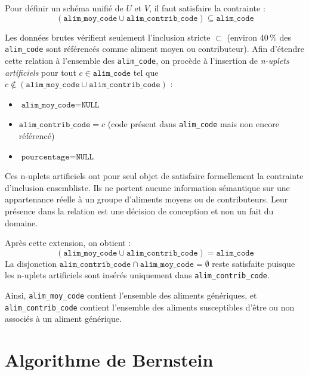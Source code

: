 \documentclass[12pt, a4paper]{article}
\newcommand{\attr}[1]{\texttt{#1}}
\begin{document}
    Pour définir un schéma unifié de $U$ et $V$, il faut satisfaire la contrainte :
    \[
        (\attr{alim\_moy\_code} \cup \attr{alim\_contrib\_code}) \subseteq \attr{alim\_code}
    \]

    Les données brutes vérifient seulement l'inclusion stricte $\subset$ (environ 40\,\% des
    \attr{alim\_code} sont référencés comme aliment moyen ou contributeur). Afin d'étendre cette relation
    à l'ensemble des \attr{alim\_code}, on procède à l'insertion de \emph{n-uplets artificiels} pour tout
    $c \in \attr{alim\_code}$ tel que
    $c \notin (\attr{alim\_moy\_code} \cup \attr{alim\_contrib\_code})$ :

    \begin{itemize}
        \item $\attr{alim\_moy\_code} = \texttt{NULL}$
        \item $\attr{alim\_contrib\_code} = c$ \quad (code présent dans \attr{alim\_code} mais non encore référencé)
        \item $\attr{pourcentage} = \texttt{NULL}$
    \end{itemize}

    \begin{notebox}
        \small
        Ces n-uplets artificiels ont pour seul objet de satisfaire formellement la contrainte d'inclusion
        ensembliste. Ils ne portent aucune information sémantique sur une appartenance réelle à un groupe
        d'aliments moyens ou de contributeurs. Leur présence dans la relation est une décision de conception
        et non un fait du domaine.
    \end{notebox}

    Après cette extension, on obtient :
    \[
        (\attr{alim\_moy\_code} \cup \attr{alim\_contrib\_code}) = \attr{alim\_code}
    \]
    La disjonction $\attr{alim\_contrib\_code} \cap \attr{alim\_moy\_code} = \emptyset$ reste satisfaite
    puisque les n-uplets artificiels sont insérés uniquement dans \attr{alim\_contrib\_code}.

    Ainsi, \attr{alim\_moy\_code} contient l'ensemble des aliments génériques, et
    \attr{alim\_contrib\_code} contient l'ensemble des aliments susceptibles d'être ou non associés à un
    aliment générique.



    \section{Algorithme de Bernstein}
\end{document}
